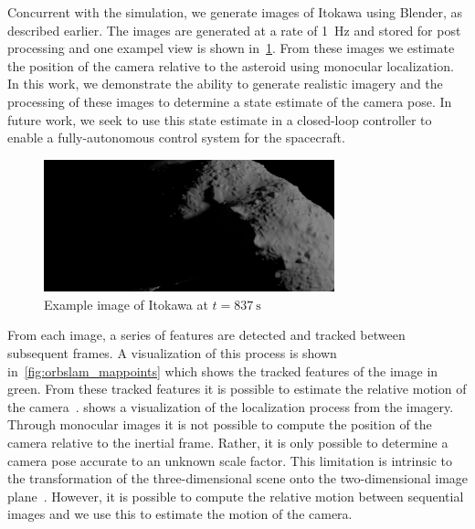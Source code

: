 \documentclass[letterpaper, paper,11pt]{AAS}		%
\begin{document}
Concurrent with the simulation, we generate images of Itokawa using Blender, as described earlier.
The images are generated at a rate of \SI{1}{\hertz} and stored for post processing and one exampel view is shown in~\cref{fig:example_image}. 
From these images we estimate the position of the camera relative to the asteroid using monocular localization.
In this work, we demonstrate the ability to generate realistic imagery and the processing of these images to determine a state estimate of the camera pose.
In future work, we seek to use this state estimate in a closed-loop controller to enable a fully-autonomous control system for the spacecraft. 
\begin{figure}[htbp]
    \centering
    \includegraphics[width=0.75\textwidth,keepaspectratio]{figures/test000837.png}
    \caption{Example image of Itokawa at \( t = \SI{837}{\second}\)\label{fig:example_image}}
\end{figure}
From each image, a series of features are detected and tracked between subsequent frames.
A visualization of this process is shown in~\cref{fig:orbslam_mappoints} which shows the tracked features of the image in green.
From these tracked features it is possible to estimate the relative motion of the camera~\cite{szeliski2010}.
 shows a visualization of the localization process from the imagery. 
Through monocular images it is not possible to compute the position of the camera relative to the inertial frame.
Rather, it is only possible to determine a camera pose accurate to an unknown scale factor. 
This limitation is intrinsic to the transformation of the three-dimensional scene onto the two-dimensional image plane~\cite{szeliski2010}.
However, it is possible to compute the relative motion between sequential images and we use this to estimate the motion of the camera.
\end{document}
